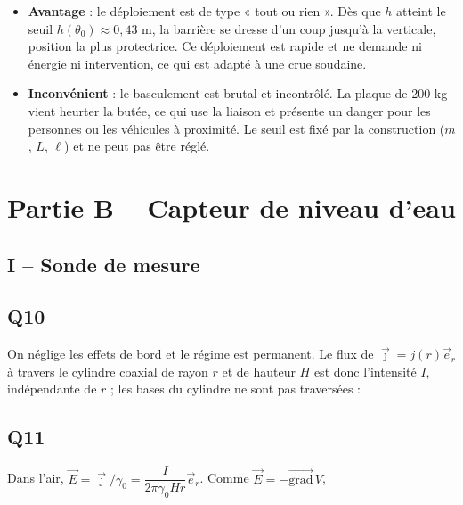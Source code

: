 \documentclass[11pt,a4paper]{article}
\providecommand{\tightlist}{\setlength{\itemsep}{0pt}\setlength{\parskip}{0pt}}
\newcommand{\equationajustee}[1]{%
  \sbox{\boiteequation}{$\displaystyle #1$}%
  \ifdim\wd\boiteequation>\linewidth
    \[\resizebox{\linewidth}{!}{\usebox{\boiteequation}}\]%
  \else
    \[#1\]%
  \fi}
\begin{document}
\begin{itemize}
\tightlist
\item
  \textbf{Avantage} : le déploiement est de type « tout ou rien ». Dès que \(h\) atteint le seuil \(h(\theta_0)\approx 0{,}43\) m, la barrière se dresse d'un coup jusqu'à la verticale, position la plus protectrice. Ce déploiement est rapide et ne demande ni énergie ni intervention, ce qui est adapté à une crue soudaine.
\item
  \textbf{Inconvénient} : le basculement est brutal et incontrôlé. La plaque de 200 kg vient heurter la butée, ce qui use la liaison et présente un danger pour les personnes ou les véhicules à proximité. Le seuil est fixé par la construction (\(m\), \(L\), \(\ell\)) et ne peut pas être réglé.
\end{itemize}

\hypertarget{partie-b-capteur-de-niveau-deau}{%
\section{Partie B -- Capteur de niveau d'eau}\label{partie-b-capteur-de-niveau-deau}}

\hypertarget{i-sonde-de-mesure}{%
\subsection{I -- Sonde de mesure}\label{i-sonde-de-mesure}}

\hypertarget{q10}{%
\subsection{Q10}\label{q10}}

On néglige les effets de bord et le régime est permanent. Le flux de \(\vec\jmath=j(r)\vec e_r\) à travers le cylindre coaxial de rayon \(r\) et de hauteur \(H\) est donc l'intensité \(I\), indépendante de \(r\) ; les bases du cylindre ne sont pas traversées :

\equationajustee{I=j(r)\,2\pi rH}

\equationajustee{\boxed{j(r)=\frac{I}{2\pi rH}}}

\hypertarget{q11}{%
\subsection{Q11}\label{q11}}

Dans l'air, \(\vec E=\vec\jmath/\gamma_0=\dfrac{I}{2\pi\gamma_0Hr}\vec e_r\). Comme \(\vec E=-\overrightarrow{\text{grad}}\,V\),
\end{document}
